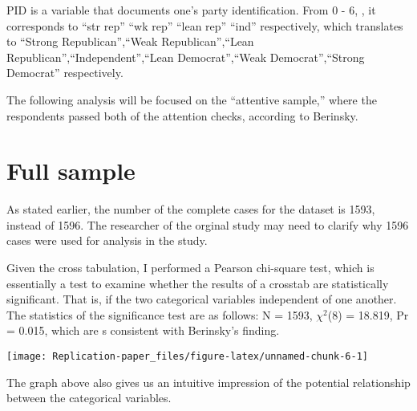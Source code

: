 \documentclass[AER]{AEA}
\begin{document}
PID is a variable that documents one's party identification. From 0 - 6,
, it corresponds to ``str rep'' ``wk rep'' ``lean rep'' ``ind''
respectively, which translates to ``Strong Republican'',``Weak
Republican'',``Lean Republican'',``Independent'',``Lean
Democrat'',``Weak Democrat'',``Strong Democrat'' respectively.

The following analysis will be focused on the ``attentive sample,''
where the respondents passed both of the attention checks, according to
Berinsky.

\hypertarget{full-sample}{%
\section{Full sample}\label{full-sample}}

As stated earlier, the number of the complete cases for the dataset is
1593, instead of 1596. The researcher of the orginal study may need to
clarify why 1596 cases were used for analysis in the study.

\begin{table}

\caption{\label{tab:full sample}Treatment groups in the full sample}
\centering
{}
\end{table}

Given the cross tabulation, I performed a Pearson chi-square test, which
is essentially a test to examine whether the results of a crosstab are
statistically significant. That is, if the two categorical variables
independent of one another. The statistics of the significance test are
as follows: N = 1593, \(\chi^2\)(8) = 18.819, Pr = 0.015, which are s
consistent with Berinsky's finding.

\begin{center}\texttt{[image: Replication-paper\_files/figure-latex/unnamed-chunk-6-1]} \end{center}

The graph above also gives us an intuitive impression of the potential
relationship between the categorical variables.
\end{document}
